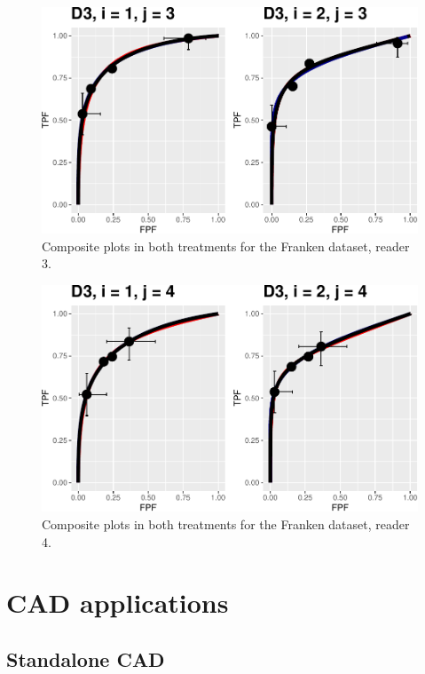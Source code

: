 \documentclass[
]{book}
\begin{document}
\begin{figure}
\centering
\includegraphics{12-rsm-3-fits_files/figure-latex/rsm-3-fits-plots-fr-1-3-1.pdf}
\caption{\label{fig:rsm-3-fits-plots-fr-1-3}Composite plots in both treatments for the Franken dataset, reader 3.}
\end{figure}

\begin{figure}
\centering
\includegraphics{12-rsm-3-fits_files/figure-latex/rsm-3-fits-plots-fr-1-4-1.pdf}
\caption{\label{fig:rsm-3-fits-plots-fr-1-4}Composite plots in both treatments for the Franken dataset, reader 4.}
\end{figure}

\hypertarget{part-cad-applications}{%
\part*{CAD applications}\label{part-cad-applications}}

\hypertarget{standalone-cad-radiologists}{%
\chapter{Standalone CAD}\label{standalone-cad-radiologists}}
\end{document}
